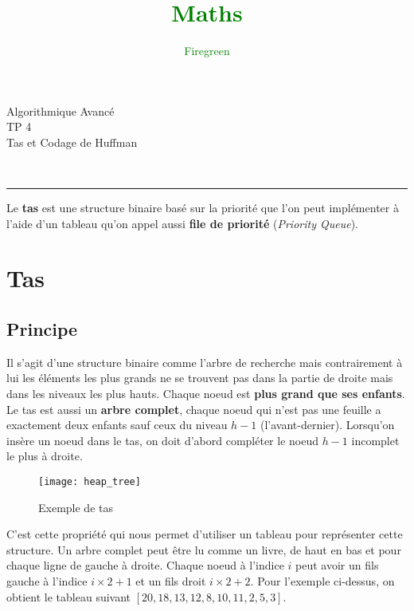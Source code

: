 \documentclass[11pt]{extarticle}
\author{\textcolor{Green}{Firegreen}}
\title{\textcolor{Green}{\textbf{Maths}}}
\begin{document}
\begin{minipage}[t]{0.3\paperwidth}
\begin{flushleft}
\end{flushleft}
\end{minipage}
\begin{minipage}[t]{0.4\paperwidth}
\begin{flushright}
\noindent \Huge{Algorithmique Avancé} \\
\noindent \LARGE{TP 4} \\
\noindent \Large{Tas et Codage de Huffman}
\end{flushright}
\end{minipage}\\
\begin{center}
\rule{\textwidth}{0.2cm}
\end{center}
Le \textbf{tas} est une structure binaire basé sur la priorité que l'on peut implémenter à l'aide d'un tableau qu'on appel aussi \textbf{file de priorité} (\textit{Priority Queue}).
  
\section{Tas}
\subsection{Principe}
Il s'agit d'une structure binaire comme l'arbre de recherche mais contrairement à lui les éléments les plus grands ne se trouvent pas dans la partie de droite mais dans les niveaux les plus hauts. Chaque noeud est \textbf{plus grand que ses enfants}.\\
Le tas est aussi un \textbf{arbre complet}, chaque noeud qui n'est pas une feuille a exactement deux enfants sauf ceux du niveau $h-1$ (l'avant-dernier). Lorsqu'on insère un noeud dans le tas, on doit d'abord compléter le noeud $h-1$ incomplet le plus à droite.
\begin{figure}[h]
\begin{center}
\texttt{[image: heap\_tree]}
\end{center}
\caption{Exemple de tas}
\end{figure}
C'est cette propriété qui nous permet d'utiliser un tableau pour représenter cette structure. Un arbre complet peut être lu comme un livre, de haut en bas et pour chaque ligne de gauche à droite. Chaque noeud à l'indice $i$ peut avoir un fils gauche à l'indice $i \times 2+1$ et un fils droit $i \times 2+2$.
Pour l'exemple ci-dessus, on obtient le tableau suivant $[ 20, 18, 13, 12, 8, 10, 11, 2, 5, 3 ]$.
\end{document}

